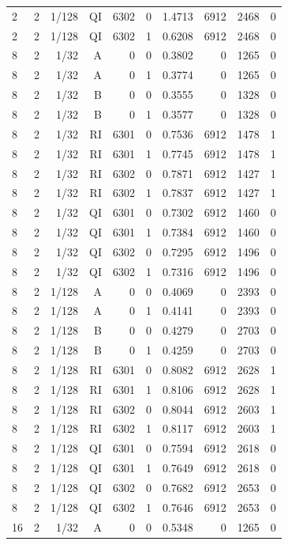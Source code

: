 \begin{longtable}{lrrrrrrrrr}
2 & 2 & 1/128 & QI & 6302 & 0 & 1.4713 & 6912 & 2468 & 0 \\
2 & 2 & 1/128 & QI & 6302 & 1 & 0.6208 & 6912 & 2468 & 0 \\
8 & 2 & 1/32 & A & 0 & 0 & 0.3802 & 0 & 1265 & 0 \\
8 & 2 & 1/32 & A & 0 & 1 & 0.3774 & 0 & 1265 & 0 \\
8 & 2 & 1/32 & B & 0 & 0 & 0.3555 & 0 & 1328 & 0 \\
8 & 2 & 1/32 & B & 0 & 1 & 0.3577 & 0 & 1328 & 0 \\
8 & 2 & 1/32 & RI & 6301 & 0 & 0.7536 & 6912 & 1478 & 1 \\
8 & 2 & 1/32 & RI & 6301 & 1 & 0.7745 & 6912 & 1478 & 1 \\
8 & 2 & 1/32 & RI & 6302 & 0 & 0.7871 & 6912 & 1427 & 1 \\
8 & 2 & 1/32 & RI & 6302 & 1 & 0.7837 & 6912 & 1427 & 1 \\
8 & 2 & 1/32 & QI & 6301 & 0 & 0.7302 & 6912 & 1460 & 0 \\
8 & 2 & 1/32 & QI & 6301 & 1 & 0.7384 & 6912 & 1460 & 0 \\
8 & 2 & 1/32 & QI & 6302 & 0 & 0.7295 & 6912 & 1496 & 0 \\
8 & 2 & 1/32 & QI & 6302 & 1 & 0.7316 & 6912 & 1496 & 0 \\
8 & 2 & 1/128 & A & 0 & 0 & 0.4069 & 0 & 2393 & 0 \\
8 & 2 & 1/128 & A & 0 & 1 & 0.4141 & 0 & 2393 & 0 \\
8 & 2 & 1/128 & B & 0 & 0 & 0.4279 & 0 & 2703 & 0 \\
8 & 2 & 1/128 & B & 0 & 1 & 0.4259 & 0 & 2703 & 0 \\
8 & 2 & 1/128 & RI & 6301 & 0 & 0.8082 & 6912 & 2628 & 1 \\
8 & 2 & 1/128 & RI & 6301 & 1 & 0.8106 & 6912 & 2628 & 1 \\
8 & 2 & 1/128 & RI & 6302 & 0 & 0.8044 & 6912 & 2603 & 1 \\
8 & 2 & 1/128 & RI & 6302 & 1 & 0.8117 & 6912 & 2603 & 1 \\
8 & 2 & 1/128 & QI & 6301 & 0 & 0.7594 & 6912 & 2618 & 0 \\
8 & 2 & 1/128 & QI & 6301 & 1 & 0.7649 & 6912 & 2618 & 0 \\
8 & 2 & 1/128 & QI & 6302 & 0 & 0.7682 & 6912 & 2653 & 0 \\
8 & 2 & 1/128 & QI & 6302 & 1 & 0.7646 & 6912 & 2653 & 0 \\
16 & 2 & 1/32 & A & 0 & 0 & 0.5348 & 0 & 1265 & 0 \\

\end{longtable}
